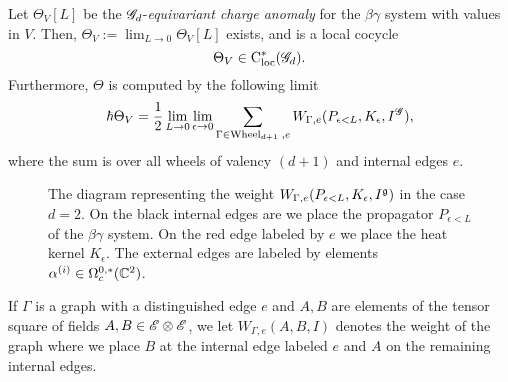 \begin{lem}\label{lem: obs}
Let $\Theta_V[L]$ be the $\mathscr G_d$-{\em equivariant charge anomaly} for the $\beta\gamma$ system with values in $V$.
Then, $\Theta_V := \lim_{L \to 0} \Theta_V[L]$ exists, and is a local cocycle 
\[
\Theta_V \in {\rm C}_{\rm loc}^*(\mathscr G_d) .
\]
Furthermore, $\Theta$ is computed by the following limit
\[
\hbar \Theta_V = \frac{1}{2} \lim_{L \to 0} \lim_{\epsilon \to 0} \sum_{\Gamma \in {\rm Wheel}_{d+1} \; , e} W_{\Gamma, e}(P_{\epsilon <L}, K_\epsilon, I^{\mathscr G}) ,
\] 
where the sum is over all wheels of valency $(d+1)$ and internal edges $e$. 
\end{lem}

\begin{figure}
\begin{center}
\caption{The diagram representing the weight $W_{\Gamma, e}(P_{\epsilon<L}, K_\epsilon, I^\mathfrak g)$ in the case $d=2$. 
On the black internal edges are we place the propagator $P_{\epsilon < L}$ of the $\beta\gamma$ system. 
On the red edge labeled by $e$ we place the heat kernel $K_\epsilon$.
The external edges are labeled by elements $\alpha^{(i)} \in \Omega^{0,*}_c(\mathbb C^2)$.}
\label{fig:liewheel}
\end{center}
\end{figure}

\begin{rmk}
If $\Gamma$ is a graph with a distinguished edge $e$ and $A,B$ are elements of the tensor square of fields $A, B \in \mathscr E \otimes \mathscr E$, we let $W_{\Gamma,e}(A,B, I)$ denotes the weight of the graph where we place $B$ at the internal edge labeled $e$ and $A$ on the remaining internal edges.
\end{rmk}

